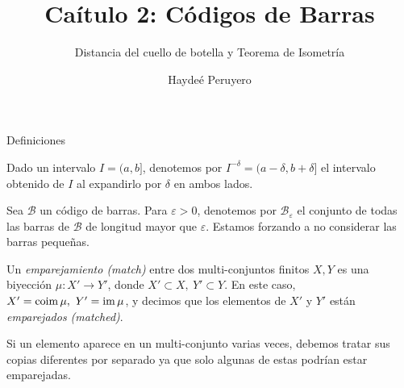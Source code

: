 \documentclass{beamer}
\title{Caítulo 2: Códigos de Barras}
\subtitle{Distancia del cuello de botella y Teorema de Isometría} %
\author{Haydeé Peruyero}
\DeclareMathOperator{\coim}{coim}
\newcommand{\calB}{{\mathcal{B}}}
\newcommand{\epsi}{\varepsilon}
\begin{document}
\frenchspacing


  \frame{\maketitle}


%


\begin{frame}{Definiciones}

Dado un intervalo $I = (a,b]$, denotemos por $I^{-\delta} = (a-\delta, b+\delta]$ el intervalo obtenido de $I$ al expandirlo por $\delta$ en ambos lados. \\[0.2cm] \pause

Sea $\calB$ un código de barras. Para $\epsi > 0$, denotemos por ${\calB}_\epsi$ el conjunto de todas las barras de $\calB$ de longitud mayor que $\epsi$. Estamos forzando a no considerar las barras pequeñas. \\[0.2cm] \pause

Un {\color{green}\emph{emparejamiento (match)}} entre dos multi-conjuntos finitos $X,Y$ es una biyección $\mu : X' \to Y'$, donde $X' \subset X,\ Y' \subset Y$. En este caso, $X' = \coim \mu,\ Y' = \im \mu$, y decimos que los elementos de $X'$ y $Y'$ están {\color{green}\emph{emparejados (matched)}}. \pause 

Si un elemento aparece en un multi-conjunto varias veces, debemos tratar sus copias diferentes por separado ya que solo algunas de estas podrían estar emparejadas. 

\end{frame}
\end{document}
